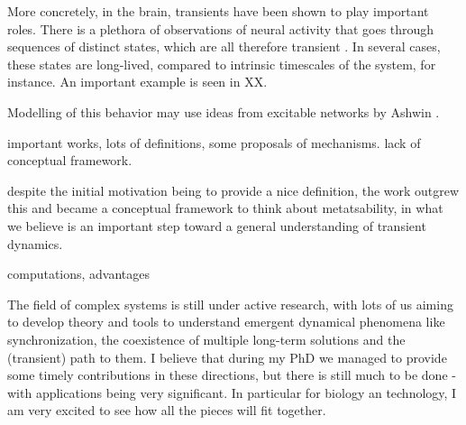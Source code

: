 More concretely, in the brain, transients have been shown to play important roles. There is a plethora of observations of neural activity that goes through sequences of distinct states, which are all therefore transient \cite{tognoli2014metastable, brinkman2022metastable}. In several cases, these states are long-lived, compared to intrinsic timescales of the system, for instance. An important example is seen in XX.


Modelling of this behavior may use ideas from excitable networks by Ashwin \cite{ashwin2021excitable, ashwin2024network}.

important works, lots of definitions, some proposals of mechanisms. lack of conceptual framework. 


despite the initial motivation being to provide a nice definition, the work outgrew this and became a conceptual framework to think about metatsability, in what we believe is an important step toward a general understanding of transient dynamics. 

computations, advantages

The field of complex systems is still under active research, with lots of us aiming to develop theory and tools to understand emergent dynamical phenomena like synchronization, the coexistence of multiple long-term solutions and the (transient) path to them. I believe that during my PhD we managed to provide some timely contributions in these directions, but there is still much to be done - with applications being very significant. In particular for biology an technology, I am very excited to see how all the pieces will fit together.


